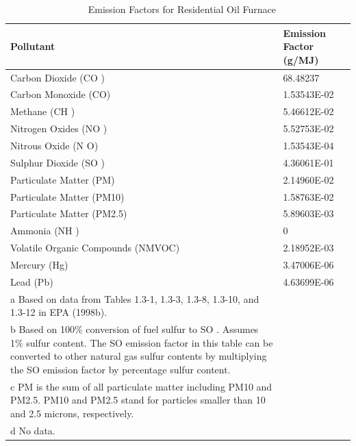 \begin{longtable}[c]{p{4.5in}p{1.5in}}
\caption{  Emission Factors for Residential Oil Furnace \protect \label{table:emission-factors-for-residential-oil-furnace}}\\
\toprule 
Pollutant & Emission Factor  ~~ (g/MJ) \tabularnewline \midrule
\endhead
Carbon Dioxide (CO  ) & 68.48237 \tabularnewline
Carbon Monoxide (CO) & 1.53543E-02 \tabularnewline
Methane (CH  ) & 5.46612E-02 \tabularnewline
Nitrogen Oxides (NO  ) & 5.52753E-02 \tabularnewline
Nitrous Oxide (N  O) & 1.53543E-04 \tabularnewline
Sulphur Dioxide (SO  ) & 4.36061E-01 \tabularnewline
Particulate Matter (PM) & 2.14960E-02 \tabularnewline
Particulate Matter (PM10) & 1.58763E-02 \tabularnewline
Particulate Matter (PM2.5) & 5.89603E-03 \tabularnewline
Ammonia (NH  ) & 0 \tabularnewline
Volatile Organic Compounds (NMVOC) & 2.18952E-03 \tabularnewline
Mercury (Hg) & 3.47006E-06 \tabularnewline
Lead (Pb) & 4.63699E-06 \tabularnewline
a Based on data from Tables 1.3-1, 1.3-3, 1.3-8, 1.3-10, and 1.3-12 in EPA (1998b). \tabularnewline
b Based on 100\% conversion of fuel sulfur to SO  . Assumes 1\% sulfur content. The SO   emission factor in this table can be converted to other natural gas sulfur contents by multiplying the SO   emission factor by percentage sulfur content. \tabularnewline
c PM is the sum of all particulate matter including PM10 and PM2.5. PM10 and PM2.5 stand for particles smaller than 10 and 2.5 microns, respectively. \tabularnewline
d No data. \tabularnewline
\bottomrule
\end{longtable}


